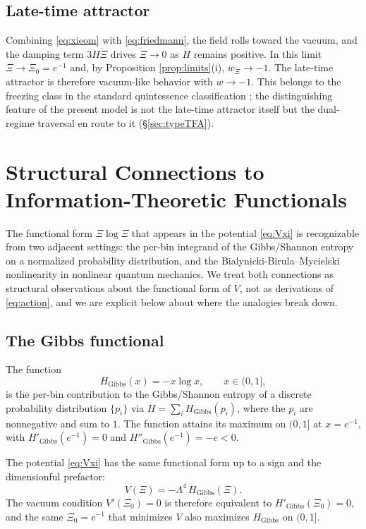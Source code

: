 \documentclass[11pt,reqno]{amsart}
\theoremstyle{plain}
\theoremstyle{definition}
\theoremstyle{remark}
\newcommand{\Gibbs}{\mathrm{Gibbs}}
\begin{document}
\subsection{Late-time attractor}

Combining \eqref{eq:xieom} with \eqref{eq:friedmann}, the field rolls
toward the vacuum, and the damping term $3H\dot\Xi$ drives $\dot\Xi \to 0$
as $H$ remains positive. In this limit $\Xi \to \Xi_0 = e^{-1}$ and, by
Proposition \ref{prop:limits}(i), $w_\Xi \to -1$. The
late-time attractor is therefore vacuum-like behavior with $w \to -1$.
This belongs to the freezing class in the standard quintessence
classification \cite{CaldwellLinder2005,ScherrerSen2008Thawing}; the
distinguishing feature of the present model is not the late-time
attractor itself but the dual-regime traversal en route to it
(\S\ref{sec:typeTFA}).

\section{Structural Connections to Information-Theoretic Functionals}\label{sec:entropy}

The functional form $\Xi\log\Xi$ that appears in the potential
\eqref{eq:Vxi} is recognizable from two adjacent settings: the per-bin
integrand of the Gibbs/Shannon entropy on a normalized probability
distribution, and the Bialynicki-Birula--Mycielski nonlinearity in
nonlinear quantum mechanics. We treat both connections as structural
observations about the functional form of $V$, not as derivations of
\eqref{eq:action}, and we are explicit below about where the analogies
break down.

\subsection{The Gibbs functional}

The function
\begin{equation}\label{eq:entropy}
  H_{\Gibbs}(x) = -x \log x,
  \qquad x \in (0,1],
\end{equation}
is the per-bin contribution to the Gibbs/Shannon entropy of a discrete
probability distribution $\{p_i\}$ via $H = \sum_i H_{\Gibbs}(p_i)$,
where the $p_i$ are nonnegative and sum to $1$. The function attains its
maximum on $(0,1]$ at $x = e^{-1}$, with $H'_{\Gibbs}(e^{-1}) = 0$ and
$H''_{\Gibbs}(e^{-1}) = -e < 0$.

The potential \eqref{eq:Vxi} has the same functional form up to a sign
and the dimensionful prefactor:
\begin{equation}\label{eq:formal-rel}
  V(\Xi) = -\Lambda^{4}\,H_{\Gibbs}(\Xi).
\end{equation}
The vacuum condition $V'(\Xi_0) = 0$ is therefore equivalent to
$H'_{\Gibbs}(\Xi_0) = 0$, and the same $\Xi_0 = e^{-1}$ that minimizes
$V$ also maximizes $H_{\Gibbs}$ on $(0,1]$.
\end{document}
